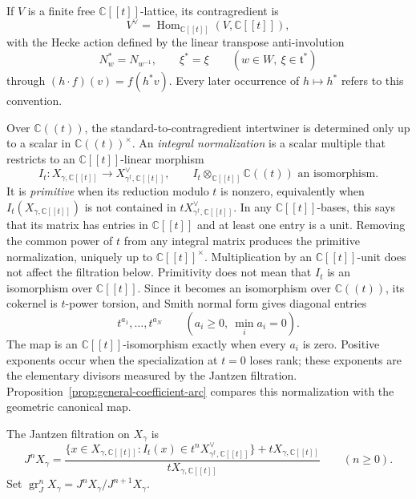 \documentclass[10pt,a4paper]{amsart}
\newcommand{\C}{\mathbb C}
\newcommand{\A}{\C[[t]]}
\newcommand{\K}{\C((t))}
\begin{document}
If $V$ is a finite free $\A$-lattice,
its contragredient is
\[
 V^\vee=\operatorname{Hom}_{\A}(V,\A),
\]
with the Hecke action defined by the linear transpose anti-involution
\[
 N_w^*=N_{w^{-1}},\qquad \xi^*=\xi
 \qquad(w\in W,\ \xi\in\mathfrak t^*)
\]
through $(h\cdot f)(v)=f(h^*v)$.  Every later occurrence of $h\mapsto h^*$
refers to this convention.

Over $\K$, the standard-to-contragredient intertwiner is determined only up
to a scalar in $\K^\times$.  An \emph{integral normalization} is a scalar
multiple that restricts to an $\A$-linear morphism
\[
 I_t:X_{\gamma,\A}\longrightarrow X_{\gamma^\dagger,\A}^{\vee},
 \qquad I_t\otimes_{\A}\K\text{ an isomorphism}.
\]
It is \emph{primitive} when its reduction modulo $t$ is nonzero, equivalently
when $I_t(X_{\gamma,\A})$ is not contained in
$tX_{\gamma^\dagger,\A}^{\vee}$.  In any $\A$-bases, this says that its
matrix has entries in $\A$ and at least one entry is a unit.  Removing the
common power of $t$ from any integral matrix produces the primitive
normalization, uniquely up to $\A^\times$.  Multiplication by an $\A$-unit
does not affect the filtration below.
Primitivity does not mean that $I_t$ is an isomorphism over $\A$.  Since it
becomes an isomorphism over $\K$, its cokernel is $t$-power torsion, and Smith
normal form gives diagonal entries
\[
 t^{a_1},\ldots,t^{a_N}\qquad(a_i\geq0,\ \min_i a_i=0).
\]
The map is an $\A$-isomorphism exactly when every $a_i$ is zero.  Positive
exponents occur when the specialization at $t=0$ loses rank; these exponents
are the elementary divisors measured by the Jantzen filtration.
Proposition~\ref{prop:general-coefficient-arc} compares this normalization
with the geometric canonical map.

The Jantzen filtration on $X_\gamma$ is
\begin{equation}\label{eq:jantzen}
 J^nX_\gamma=
 \frac{\{x\in X_{\gamma,\A}: I_t(x)\in
 t^nX_{\gamma^\dagger,\A}^{\vee}\}+tX_{\gamma,\A}}
 {tX_{\gamma,\A}}\qquad(n\geq0).
\end{equation}
Set
$\operatorname{gr}_J^nX_\gamma=J^nX_\gamma/J^{n+1}X_\gamma$.
\end{document}
